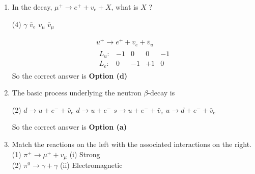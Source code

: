 \begin{enumerate}
	{}
	\begin{tasks}(2)
		\task[\textbf{a.}]$\alpha$-particle
		\task[\textbf{b.}]${ }_4 B e^7$ nucleus
		\task[\textbf{c.}]Hydrogen atom
		\task[\textbf{d.}]Deuteron 
	\end{tasks}
	\begin{answer}
		If a nucleus contains odd number of nucleons, it is fermions. If a nucleus contains even number of nucleons, it is a boson.\\
		So the correct answer is \textbf{Option (b)}
	\end{answer}
	\item  In the decay, $\mu^{+} \rightarrow e^{+}+v_e+X$, what is $X$ ?
	{}
	\begin{tasks}(4)
		\task[\textbf{a.}]$\gamma$
		\task[\textbf{b.}]$\bar{v}_e$
		\task[\textbf{c.}]$v_\mu$
		\task[\textbf{d.}]$\bar{v}_\mu$ 
	\end{tasks}
	\begin{answer}
		\begin{align*}
		u^{+} \rightarrow e^{+}+v_e+\bar{v}_u\\
		\begin{array}{rrrrr}
		L_u: & -1 & 0 & 0 & -1 \\
		L_e: & 0 & -1 & +1 & 0
		\end{array}
		\end{align*}
		So the correct answer is \textbf{Option (d)}
	\end{answer}
	\item  The basic process underlying the neutron $\beta$-decay is
	{}
	\begin{tasks}(2)
		\task[\textbf{a.}]$d \rightarrow u+e^{-}+\bar{v}_e$
		\task[\textbf{b.}]$d \rightarrow u+e^{-}$
		\task[\textbf{c.}]$s \rightarrow u+e^{-}+\bar{v}_e$
		\task[\textbf{d.}]$u \rightarrow d+e^{-}+\bar{v}_e$ 
	\end{tasks}
	\begin{answer}
		So the correct answer is \textbf{Option (a)}
	\end{answer}
	\item  Match the reactions on the left with the associated interactions on the right.\\
	(1) $\pi^{+} \rightarrow \mu^{+}+v_\mu$\hspace{3cm}
	(i) Strong\\
	(2) $\pi^0 \rightarrow \gamma+\gamma$\hspace{3.5cm}
	(ii) Electromagnetic\\

\end{enumerate}
